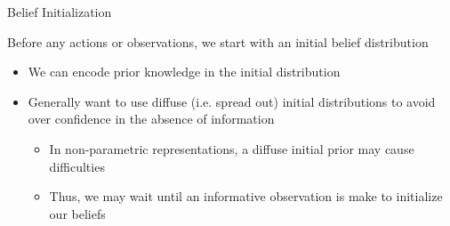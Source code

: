 \begin{frame}[fragile]{Belief Initialization}

Before any actions or observations, we start with an initial belief distribution
\begin{itemize}
    \item We can encode prior knowledge in the initial distribution
    \item Generally want to use diffuse (i.e. spread out) initial distributions to avoid over confidence in the absence of information
    \begin{itemize}
        \item In non-parametric representations, a diffuse initial prior may cause difficulties
        \item Thus, we may wait until an informative observation is make to initialize our beliefs
    \end{itemize}
\end{itemize}


\end{frame}




